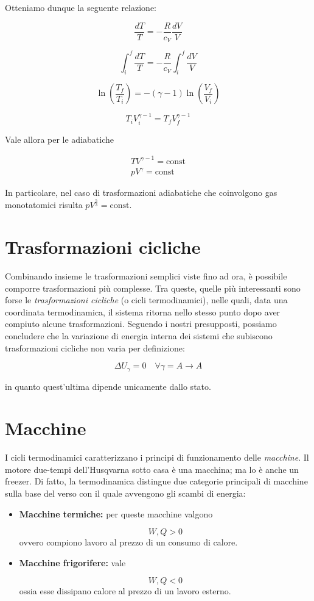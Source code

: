 Otteniamo dunque la seguente relazione:

\[ \frac{dT}{T} = -\frac{R}{c_V}\frac{dV}{V} \]

\[ \int_{i}^{f}\frac{dT}{T} = -\frac{R}{c_V}\int_{i}^{f}\frac{dV}{V} \]

\[ \ln\left( \frac{T_f}{T_i} \right) = -(\gamma - 1)\ln\left(\frac{V_f}{V_i}\right) \]

\[ T_i V_i^{\gamma - 1} = T_fV_f^{\gamma - 1} \]

Vale allora per le adiabatiche

\begin{align}
    TV^{\gamma - 1} = \text{const}\\
    pV^\gamma = \text{const}
\end{align}

In particolare, nel caso di trasformazioni adiabatiche che coinvolgono
gas monotatomici risulta $pV^{\frac53} = \text{const}$.

\section{Trasformazioni cicliche}
Combinando insieme le trasformazioni semplici viste fino ad ora, è possibile
comporre trasformazioni più complesse. Tra queste, quelle più interessanti
sono forse le \textit{trasformazioni cicliche} (o cicli termodinamici), nelle
quali, data una coordinata termodinamica, il sistema ritorna nello stesso
punto dopo aver compiuto alcune trasformazioni. Seguendo i nostri presupposti,
possiamo concludere che la variazione di energia interna dei sistemi che
subiscono trasformazioni cicliche non varia per definizione:

\[ \Delta U_\gamma = 0 \quad \forall \gamma = A \to A \]

\noindent in quanto quest'ultima dipende unicamente dallo stato.

\section{Macchine}
I cicli termodinamici caratterizzano i principi di funzionamento delle
\textit{macchine}. Il motore due-tempi dell'Husqvarna sotto
casa è una macchina; ma lo è anche un freezer. Di fatto, la termodinamica
distingue due categorie principali di macchine sulla base del verso con il
quale avvengono gli scambi di energia:

\begin{itemize}
    \item \textbf{Macchine termiche:} per queste macchine valgono
    
    \[ W,Q > 0 \]
    ovvero compiono lavoro al prezzo di un consumo di calore.

    \item \textbf{Macchine frigorifere:} vale
    
    \[ W,Q < 0 \]
    ossia esse dissipano calore al prezzo di un lavoro esterno.
\end{itemize}

